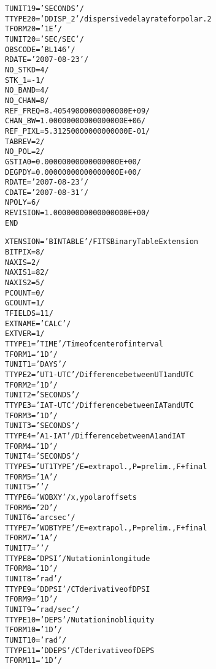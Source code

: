\documentclass[twoside]{article}
\begin{document}
\begin{alltt}
TUNIT19 = 'SECONDS '           /
TTYPE20 = 'DDISP_2 '           / dispersive delay rate for polar. 2
TFORM20 = '1E      '           /
TUNIT20 = 'SEC/SEC '           /
OBSCODE = 'BL146   '           /
RDATE   = '2007-08-23'         /
NO_STKD =                    4 /
STK_1   =                   -1 /
NO_BAND =                    4 /
NO_CHAN =                    8 /
REF_FREQ=   8.40549000000000000E+09 /
CHAN_BW =   1.00000000000000000E+06 /
REF_PIXL=   5.31250000000000000E-01 /
TABREV  =                    2 /
NO_POL  =                    2 /
GSTIA0  =   0.00000000000000000E+00 /
DEGPDY  =   0.00000000000000000E+00 /
RDATE   = '2007-08-23'         /
CDATE   = '2007-08-31'         /
NPOLY   =                    6 /
REVISION=   1.00000000000000000E+00 /
END
\end{alltt}

\begin{alltt}
XTENSION= 'BINTABLE'           / FITS Binary Table Extension
BITPIX  =                    8 /
NAXIS   =                    2 /
NAXIS1  =                   82 /
NAXIS2  =                    5 /
PCOUNT  =                    0 /
GCOUNT  =                    1 /
TFIELDS =                   11 /
EXTNAME = 'CALC    '           /
EXTVER  =                    1 /
TTYPE1  = 'TIME    '           / Time of center of interval
TFORM1  = '1D      '           /
TUNIT1  = 'DAYS    '           /
TTYPE2  = 'UT1-UTC '           / Difference between UT1 and UTC
TFORM2  = '1D      '           /
TUNIT2  = 'SECONDS '           /
TTYPE3  = 'IAT-UTC '           / Difference between IAT and UTC
TFORM3  = '1D      '           /
TUNIT3  = 'SECONDS '           /
TTYPE4  = 'A1-IAT  '           / Difference between A1 and IAT
TFORM4  = '1D      '           /
TUNIT4  = 'SECONDS '           /
TTYPE5  = 'UT1 TYPE'           / E=extrapol., P=prelim., F+final
TFORM5  = '1A      '           /
TUNIT5  = '        '           /
TTYPE6  = 'WOBXY   '           / x, y polar offsets
TFORM6  = '2D      '           /
TUNIT6  = 'arcsec  '           /
TTYPE7  = 'WOB TYPE'           / E=extrapol., P=prelim., F+final
TFORM7  = '1A      '           /
TUNIT7  = '        '           /
TTYPE8  = 'DPSI    '           / Nutation in longitude
TFORM8  = '1D      '           /
TUNIT8  = 'rad     '           /
TTYPE9  = 'DDPSI   '           / CT derivative of DPSI
TFORM9  = '1D      '           /
TUNIT9  = 'rad/sec '           /
TTYPE10 = 'DEPS    '           / Nutation in obliquity
TFORM10 = '1D      '           /
TUNIT10 = 'rad     '           /
TTYPE11 = 'DDEPS   '           / CT derivative of DEPS
TFORM11 = '1D      '           /

\end{alltt}
\end{document}
